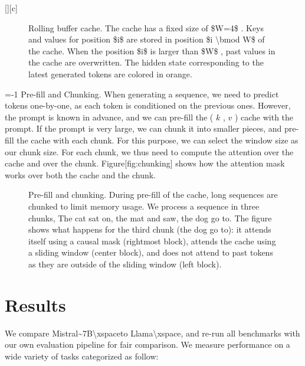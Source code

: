 \documentclass[11pt,a4paper]{article}
\begin{document}
[][c]

\begin{figure}[h]
\caption{Rolling buffer cache. The cache has a fixed size of  \$W=4\$ . Keys and values for position  \$i\$  are stored in position  \$i \textbackslash{}bmod W\$  of the cache. When the position  \$i\$  is larger than  \$W\$ , past values in the cache are overwritten. The hidden state corresponding to the latest generated tokens are colored in orange.}
\end{figure}

=-1 Pre-fill and Chunking. When generating a sequence, we need to predict tokens one-by-one, as each token is conditioned on the previous ones. However, the prompt is known in advance, and we can pre-fill the ( $k$ ,  $v$ ) cache with the prompt. If the prompt is very large, we can chunk it into smaller pieces, and pre-fill the cache with each chunk. For this purpose, we can select the window size as our chunk size. For each chunk, we thus need to compute the attention over the cache and over the chunk. Figure[fig:chunking] shows how the attention mask works over both the cache and the chunk.

\begin{figure}[h]
\caption{Pre-fill and chunking. During pre-fill of the cache, long sequences are chunked to limit memory usage. We process a sequence in three chunks, The cat sat on, the mat and saw, the dog go to. The figure shows what happens for the third chunk (the dog go to): it attends itself using a causal mask (rightmost block), attends the cache using a sliding window (center block), and does not attend to past tokens as they are outside of the sliding window (left block).}
\end{figure}

\section{Results}

We compare Mistral\textasciitilde{}7B\textbackslash{}xspaceto Llama\textbackslash{}xspace, and re-run all benchmarks with our own evaluation pipeline for fair comparison. We measure performance on a wide variety of tasks categorized as follow:
\end{document}
